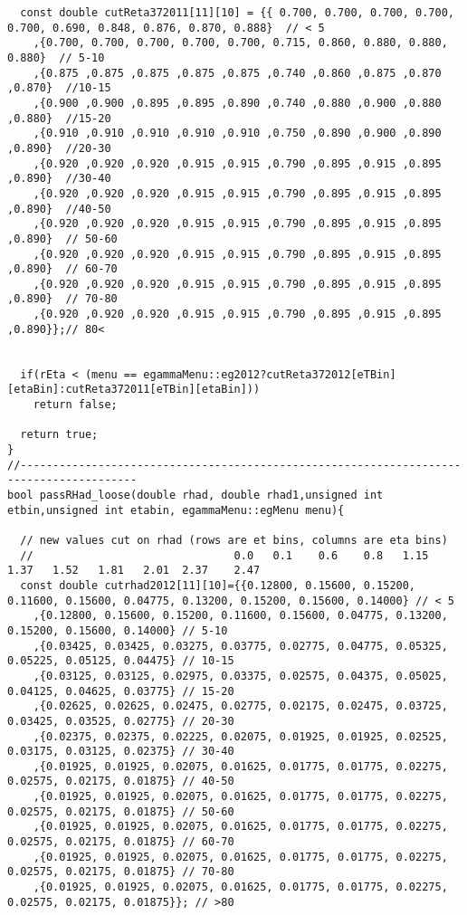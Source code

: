 \begin{lstlisting}
  const double cutReta372011[11][10] = {{ 0.700, 0.700, 0.700, 0.700, 0.700, 0.690, 0.848, 0.876, 0.870, 0.888}  // < 5
	,{0.700, 0.700, 0.700, 0.700, 0.700, 0.715, 0.860, 0.880, 0.880, 0.880}  // 5-10
	,{0.875 ,0.875 ,0.875 ,0.875 ,0.875 ,0.740 ,0.860 ,0.875 ,0.870 ,0.870}  //10-15
	,{0.900 ,0.900 ,0.895 ,0.895 ,0.890 ,0.740 ,0.880 ,0.900 ,0.880 ,0.880}  //15-20
	,{0.910 ,0.910 ,0.910 ,0.910 ,0.910 ,0.750 ,0.890 ,0.900 ,0.890 ,0.890}  //20-30
	,{0.920 ,0.920 ,0.920 ,0.915 ,0.915 ,0.790 ,0.895 ,0.915 ,0.895 ,0.890}  //30-40
	,{0.920 ,0.920 ,0.920 ,0.915 ,0.915 ,0.790 ,0.895 ,0.915 ,0.895 ,0.890}  //40-50
	,{0.920 ,0.920 ,0.920 ,0.915 ,0.915 ,0.790 ,0.895 ,0.915 ,0.895 ,0.890}  // 50-60
	,{0.920 ,0.920 ,0.920 ,0.915 ,0.915 ,0.790 ,0.895 ,0.915 ,0.895 ,0.890}  // 60-70 
	,{0.920 ,0.920 ,0.920 ,0.915 ,0.915 ,0.790 ,0.895 ,0.915 ,0.895 ,0.890}  // 70-80 
	,{0.920 ,0.920 ,0.920 ,0.915 ,0.915 ,0.790 ,0.895 ,0.915 ,0.895 ,0.890}};// 80<   
                       

  if(rEta < (menu == egammaMenu::eg2012?cutReta372012[eTBin][etaBin]:cutReta372011[eTBin][etaBin]))
    return false;

  return true;
}
//----------------------------------------------------------------------------------------
bool passRHad_loose(double rhad, double rhad1,unsigned int etbin,unsigned int etabin, egammaMenu::egMenu menu){
  
  // new values cut on rhad (rows are et bins, columns are eta bins)
  //                               0.0   0.1    0.6    0.8   1.15   1.37   1.52   1.81   2.01  2.37    2.47
  const double cutrhad2012[11][10]={{0.12800, 0.15600, 0.15200, 0.11600, 0.15600, 0.04775, 0.13200, 0.15200, 0.15600, 0.14000} // < 5 
	,{0.12800, 0.15600, 0.15200, 0.11600, 0.15600, 0.04775, 0.13200, 0.15200, 0.15600, 0.14000} // 5-10
	,{0.03425, 0.03425, 0.03275, 0.03775, 0.02775, 0.04775, 0.05325, 0.05225, 0.05125, 0.04475} // 10-15
	,{0.03125, 0.03125, 0.02975, 0.03375, 0.02575, 0.04375, 0.05025, 0.04125, 0.04625, 0.03775} // 15-20
	,{0.02625, 0.02625, 0.02475, 0.02775, 0.02175, 0.02475, 0.03725, 0.03425, 0.03525, 0.02775} // 20-30
	,{0.02375, 0.02375, 0.02225, 0.02075, 0.01925, 0.01925, 0.02525, 0.03175, 0.03125, 0.02375} // 30-40
	,{0.01925, 0.01925, 0.02075, 0.01625, 0.01775, 0.01775, 0.02275, 0.02575, 0.02175, 0.01875} // 40-50
	,{0.01925, 0.01925, 0.02075, 0.01625, 0.01775, 0.01775, 0.02275, 0.02575, 0.02175, 0.01875} // 50-60
	,{0.01925, 0.01925, 0.02075, 0.01625, 0.01775, 0.01775, 0.02275, 0.02575, 0.02175, 0.01875} // 60-70
	,{0.01925, 0.01925, 0.02075, 0.01625, 0.01775, 0.01775, 0.02275, 0.02575, 0.02175, 0.01875} // 70-80
	,{0.01925, 0.01925, 0.02075, 0.01625, 0.01775, 0.01775, 0.02275, 0.02575, 0.02175, 0.01875}}; // >80


\end{lstlisting}
